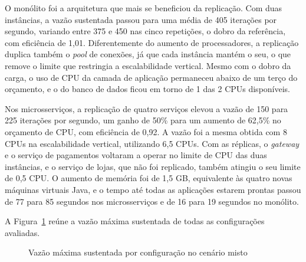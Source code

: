 O monólito foi a arquitetura que mais se beneficiou da replicação. Com duas instâncias, a vazão
sustentada passou para uma média de 405 iterações por segundo, variando entre 375 e 450 nas cinco
repetições, o dobro da referência, com eficiência de 1,01. Diferentemente do aumento de
processadores, a replicação duplica também o \textit{pool} de conexões, já que cada instância
mantém o seu, o que remove o limite que restringia a escalabilidade vertical. Mesmo com o dobro da
carga, o uso de CPU da camada de aplicação permaneceu abaixo de um terço do orçamento, e o do banco
de dados ficou em torno de 1 das 2 CPUs disponíveis.

Nos microsserviços, a replicação de quatro serviços elevou a vazão de 150 para 225 iterações por
segundo, um ganho de 50\% para um aumento de 62,5\% no orçamento de CPU, com eficiência de 0,92.
A vazão foi a mesma obtida com 8 CPUs na escalabilidade vertical, utilizando 6,5 CPUs. Com as
réplicas, o \textit{gateway} e o serviço de pagamentos voltaram a operar no limite de CPU das duas
instâncias, e o serviço de lojas, que não foi replicado, também atingiu o seu limite de 0,5 CPU.
O aumento de memória foi de 1,5 GB, equivalente às quatro novas máquinas virtuais Java, e o tempo
até todas as aplicações estarem prontas passou de 77 para 85 segundos nos microsserviços e de 16
para 19 segundos no monólito.

A Figura~\ref{fig:escala} reúne a vazão máxima sustentada de todas as configurações avaliadas.

\begin{figure}[htbp]
\centering
\caption{Vazão máxima sustentada por configuração no cenário misto}
\label{fig:escala}
\par\vspace{4pt}{\footnotesize Fonte: Elaborada pelo autor (2026). As configurações com instâncias utilizam o balanceador Nginx e 4 CPUs por instância; nos microsserviços, com duas instâncias, apenas quatro serviços foram replicados. Com 2 CPUs, os microsserviços não sustentaram o primeiro degrau, de 50 iterações por segundo.}
\end{figure}

